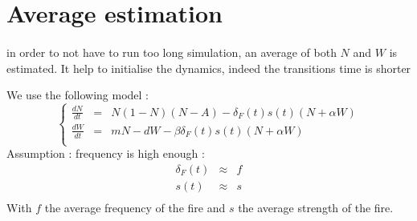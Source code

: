 \documentclass{article}
\begin{document}

\newpage
\section{Average estimation}
\label{average}

\paragraph{}
in order to not have to run too long simulation, an average of both $N$ and $W$ is estimated. It help to initialise the dynamics, indeed the transitions time is shorter

We use the following model :
\[
\left\lbrace
\begin{array}{rcl}
\frac{dN}{dt} & = & N(1-N)(N-A) - \delta_F(t)s(t)(N+\alpha W) \\
\frac{dW}{dt} & = & mN -dW - \beta\delta_F(t)s(t)(N+\alpha W) \\
\end{array}
\right.
\]
Assumption : frequency is high enough : 
\[
\begin{array}{rcl}
\delta_F(t) & \approx & f \\
s(t) & \approx & s \\
\end{array}
\]
With $f$ the average frequency of the fire and $s$ the average strength of the fire.
\end{document}

